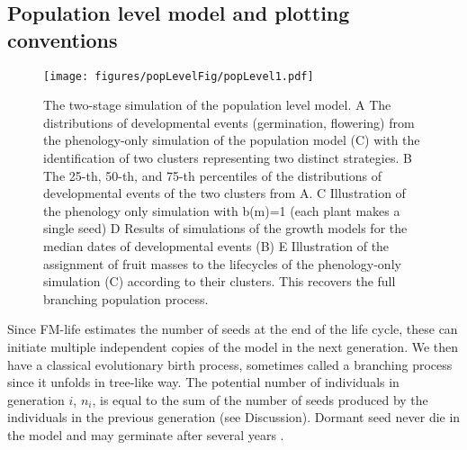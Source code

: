 \subsection{Population level model and plotting conventions}
\label{population-level-model-and-plotting-conventions}

\begin{figure}[tb]
\centering
\texttt{[image: figures/popLevelFig/popLevel1.pdf]}
\caption{The two-stage simulation of the population level model. A The
  distributions of developmental events (germination, flowering) from the
  phenology-only simulation of the population model (C) with the identification
  of two clusters representing two distinct strategies. B The 25-th, 50-th, and
  75-th percentiles of the distributions of developmental events of the two
  clusters from A. C Illustration of the phenology only simulation with b(m)=1
  (each plant makes a single seed) D Results of simulations of the growth models
  for the median dates of developmental events (B) E Illustration of the
  assignment of fruit masses to the lifecycles of the phenology-only simulation
  (C) according to their clusters. This recovers the full branching population
  process.}
\label{fig:popModel}
\end{figure}

Since FM-life estimates the number of seeds at the end of the life cycle, these
can initiate multiple independent copies of the model in the next generation. We
then have a classical evolutionary birth process, sometimes called a branching
process since it unfolds in tree-like way. The potential number of individuals
in generation \(i\), \(n_{i}\), is equal to the sum of the number of seeds
produced by the individuals in the previous generation (see Discussion). Dormant
seed never die in the model and may germinate after several years
\citep{burghardt_modeling_2015}.

